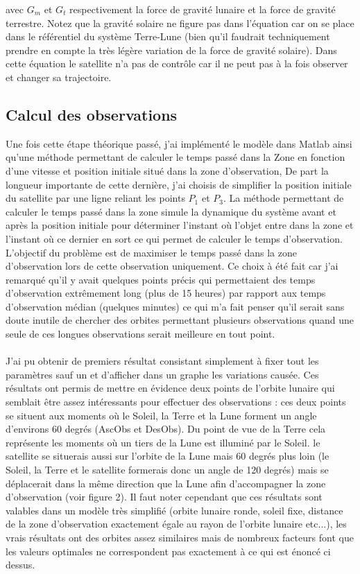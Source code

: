 \documentclass[12pt]{article} %
\begin{document}
		avec $G_m$ et $G_t$ respectivement la force de gravité lunaire et la force de gravité terrestre. Notez que la gravité solaire ne figure pas dans l'équation car on se place dans le référentiel du système Terre-Lune (bien qu'il faudrait techniquement prendre en compte la très légère variation de la force de gravité solaire). Dans cette équation le satellite n'a pas de contrôle car il ne peut pas à la fois observer et changer sa trajectoire.
		
		\subsection{Calcul des observations}
		Une fois cette étape théorique passé, j'ai implémenté le modèle dans Matlab ainsi qu'une méthode permettant de calculer le temps passé dans la \gls{Zone} en fonction d'une vitesse et position initiale situé dans la zone d'observation, De part la longueur importante de cette dernière, j'ai choisis de simplifier la position initiale du satellite par une ligne reliant les points $P_1$ et $P_3$. La méthode permettant de calculer le temps passé dans la zone simule la dynamique du système avant et après la position initiale pour déterminer l'instant où l'objet entre dans la zone et l'instant où ce dernier en sort ce qui permet de calculer le temps d'observation. L'objectif du problème est de maximiser le temps passé dans la zone d'observation lors de cette observation uniquement. Ce choix à été fait car j'ai remarqué qu'il y avait quelques points précis qui permettaient des temps d'observation extrêmement long (plus de 15 heures) par rapport aux temps d'observation médian (quelques minutes) ce qui m'a fait penser qu'il serait sans doute inutile de chercher des orbites permettant plusieurs observations quand une seule de ces longues observations serait meilleure en tout point.
		\\ \\
		J'ai pu obtenir de premiers résultat consistant simplement à fixer tout les paramètres sauf un et d'afficher dans un graphe les variations causée. Ces résultats ont permis de mettre en évidence deux points de l'orbite lunaire qui semblait être assez intéressants pour effectuer des observations : ces deux points se situent aux moments où le Soleil, la Terre et la Lune forment un angle d'environs 60 degrés (\gls{AscObs} et \gls{DesObs}). Du point de vue de la Terre cela représente les moments où un tiers de la Lune est illuminé par le Soleil. le satellite se situerais aussi sur l'orbite de la Lune mais 60 degrés plus loin (le Soleil, la Terre et le satellite formerais donc un angle de 120 degrés) mais se déplacerait dans la même direction que la Lune afin d'accompagner la zone d'observation (voir figure 2). Il faut noter cependant que ces résultats sont valables dans un modèle très simplifié (orbite lunaire ronde, soleil fixe, distance de la zone d'observation exactement égale au rayon de l'orbite lunaire etc...), les vrais résultats ont des orbites assez similaires mais de nombreux facteurs font que les valeurs optimales ne correspondent pas exactement à ce qui est énoncé ci dessus.
		
\end{document}
